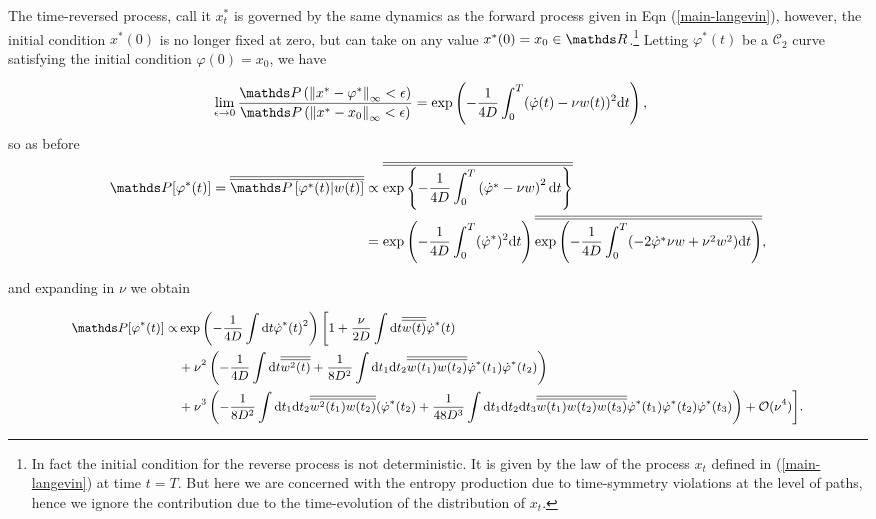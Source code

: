 The time-reversed process, call it $x^\ast_t$ is governed by the same dynamics as the forward process given in Eqn (\ref{main-langevin}), however, the initial condition $x^\ast(0)$ is no longer fixed at zero, but can take on any value $x^\ast(0)= x_0 \in \bR$.\footnote{In fact the initial condition for the reverse process is not deterministic. It is given by the law of the process $x_t$ defined in (\ref{main-langevin}) at time $t = T$. But here we are concerned with the entropy production due to time-symmetry violations at the level of paths, hence we ignore the contribution due to the time-evolution of the distribution of $x_t$.} Letting $\varphi^\ast(t)$ be a $\mathcal{C}_2$ curve satisfying the initial condition $\varphi(0) = x_0$, we have 

\begin{align}
 \lim_{\epsilon \rightarrow 0} \frac{\bP\left (\norm{x^\ast - \varphi^\ast}_\infty < \epsilon  \right)}{\bP\left (\norm{x^\ast-x_0}_\infty < \epsilon  \right)} &= \exp \left (-\frac{1}{4D} \int_0^T (\dot{\varphi}(t)-\nu w(t))^2 \rmd t \right),
\end{align}
so as before
\begin{align}\label{reverse-path-prob}
\begin{split}
\bP[\varphi^\ast(t)] = \Overline{\bP\left[\varphi^\ast(t)|w(t)\right]} &\propto \Overline{\exp \left\{-\frac{1}{4D} \int_0^T  \left(\dot{\varphi}^\ast-\nu w\right)^2 \rmd t \right\}}\\ 
&=  \exp \left(-\frac{1}{4D} \int_0^T  (\dot{\varphi}^\ast)^2 \rmd t\right) \Overline{\exp \left(-\frac{1}{4D} \int_0^T  (-2\dot{\varphi}^\ast\nu w + \nu^2 w^2) \rmd t\right)},
\end{split}
\end{align}

and expanding in $\nu$ we obtain

\begin{align}\label{reverse-path-prob}
\small
\begin{split}
\bP[\varphi^\ast(t)] \propto &\exp \left(-\frac{1}{4D} \int \rmd t \dot{\varphi}^\ast(t)^2 \right) \bigg[1+\frac{\nu}{2D}\int \rmd t \Overline{w(t)}\dot{\varphi}^\ast(t) \\ &+ \nu^2 \left(-\frac{1}{4D}\int \rmd t \Overline{w^2(t)} + \frac{1}{8D^2}\int \rmd t_1 \rmd t_2 \Overline{w(t_1)w(t_2)}\dot{\varphi}^\ast(t_1)\dot{\varphi}^\ast(t_2)\right) \\
     &+ \nu^3 \left( -\frac{1}{8D^2}\int \rmd t_1\rmd t_2 \Overline{w^2(t_1)w(t_2)}(\dot{\varphi}^\ast(t_2) + \frac{1}{48D^3}\int \rmd t_1 \rmd t_2 \rmd t_3 \Overline{w(t_1)w(t_2)w(t_3)}\dot{\varphi}^\ast(t_1)\dot{\varphi}^\ast(t_2)\dot{\varphi}^\ast(t_3) \right) + \mathcal{O}(\nu^4) \bigg].
\end{split}
\end{align}

